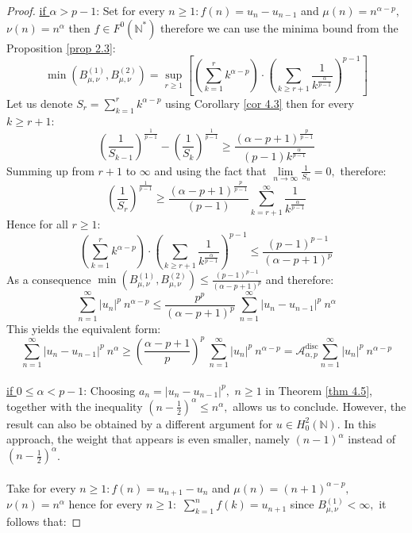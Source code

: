 \documentclass[11pt]{amsart}
\newcommand{\1}{[1]}
\begin{document}
\begin{proof} \underline{if $\alpha > p-1$}: Set for every $n\geq 1: f(n)= u_{n}-u_{n-1}$ and $\mu(n)= n^{\alpha-p},$ $\nu(n)= n^{\alpha}$ 
then $f \in F^{0}(\mathbb{N}^{*})$ therefore we can use the minima bound from the Proposition \ref{prop 2.3}:
$$\min(B_{\mu,\nu}^{(1)},B_{\mu,\nu}^{(2)}) = \sup_{r \geq 1} \left[ \left( \sum_{k=1}^{r} k^{\alpha-p} \right) \cdot \left( \sum_{k \geq r+1} \frac{1}{{k}^{\frac{\alpha}{p-1}}} \right)^{p-1} \right]$$
Let us denote $\displaystyle S_{r} =\sum_{k=1}^{r} k^{\alpha-p}$ using Corollary \ref{cor 4.3} then for every $k\geq r+1:$
$$
 \left( \frac{1}{S_{k-1}} \right)^{\frac{1}{p-1}}- \left( \frac{1}{S_{k}} \right)^{\frac{1}{p-1}} \geq  \frac{(\alpha-p+1)^{\frac{p}{p-1}}}{(p-1) k^{\frac{\alpha}{p-1}}} 
$$
Summing up from $r+1$ to $\infty$ and using the fact  that $\lim\limits_{n \to \infty} \frac{1}{S_{n}} = 0,$ therefore:
$$ \left( \frac{1}{S_{r}} \right)^{\frac{1}{p-1}}  \geq  \frac{(\alpha-p+1)^{\frac{p}{p-1}}}{(p-1)}  \sum_{k=r+1}^{\infty} \frac{1}{k^{\frac{\alpha}{p-1}}}
$$
Hence for all $r\geq 1:$
$$\left( \sum_{k=1}^{r} k^{\alpha-p} \right) \cdot \left( \sum_{k \geq r+1} \frac{1}{{k}^{\frac{\alpha}{p-1}}} \right)^{p-1} \leq \frac{(p-1)^{p-1}} {(\alpha-p+1)^p}
$$
As a consequence $\min(B_{\mu,\nu}^{(1)},B_{\mu,\nu}^{(2)})  \leq \frac{(p-1)^{p-1}} {(\alpha-p+1)^p}$ and therefore:
$$
\sum_{n=1}^{\infty} |u_{n}|^{p} \ n^{\alpha-p} \leq \frac{p^{p}}{(\alpha-p+1)^p}  \ \sum_{n=1}^{\infty} |u_{n}-u_{n-1}|^{p} \ n^{\alpha}
$$
This yields the equivalent form:
$$
\sum_{n=1}^{\infty} |u_{n}-u_{n-1}|^{p} \ n^{\alpha}  \geq  \left(\frac{\alpha-p+1}{p} \right)^p \ \sum_{n=1}^{\infty} |u_{n}|^{p} \ n^{\alpha-p} = \mathcal{A}^{\text{disc}}_{\alpha,p} \sum_{n=1}^{\infty} |u_{n}|^{p} \ n^{\alpha-p} $$ 
\phantom{.} \\
\underline{if $ 0 \leq \alpha < p-1$}: Choosing $a_n=|u_n-u_{n-1}|^p , \, \,n\geq 1$ in Theorem  \ref{thm 4.5}, together with the inequality $\left(n-\tfrac12\right)^{\alpha}\le n^{\alpha},$ allows us to conclude. However, the result can also be obtained by a different argument for $u\in H_0^2(\mathbb{N})$. In this approach, the weight that appears is even smaller, namely $(n-1)^{\alpha}$ instead of $\left(n-\tfrac12\right)^{\alpha}$. \\ \\
Take for every $n\geq 1: f(n)= u_{n+1}-u_{n}$ and $\mu(n)= (n+1)^{\alpha-p},$ $\nu(n)= n^{\alpha}$ hence for every $n\geq 1:$ $\displaystyle \sum_{k=1}^{n} f(k) = u_{n+1}$  since $B_{\mu,\nu}^{(1)} < \infty,$ it follows that:

\end{proof}
\end{document}

